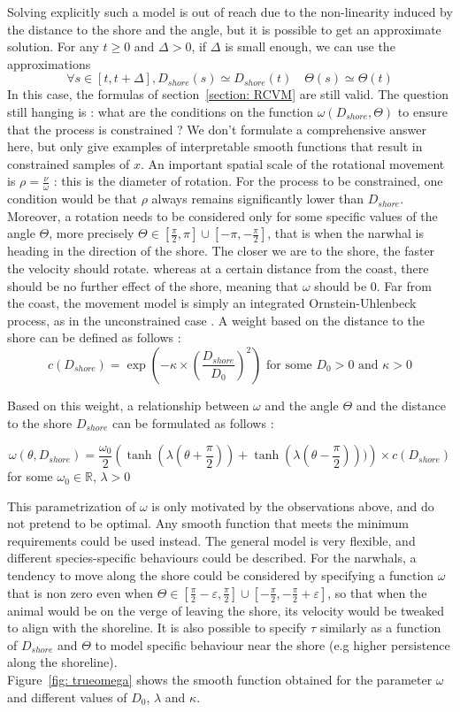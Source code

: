 \documentclass[11pt]{article}
\newcommand {\R}{\mathbb{R}}
\newcommand {\1}{\mathbb{1}}
\begin{document}
 Solving explicitly such a model is out of reach due to the non-linearity induced by the distance to the shore and the angle, but it is possible to get an approximate solution.
 For any $t \geq 0$ and $\Delta>0$, if $\Delta$ is small enough, we can use the approximations
 \[\forall s \in [t,t+\Delta], D_{shore}(s) \simeq D_{shore}(t) \quad \Theta(s)\simeq \Theta(t)\]
 In this case, the formulas of section~\ref{section: RCVM} are still valid.
 The question still hanging is : what are the conditions on the function $\omega(D_{shore},\Theta)$ to ensure that the process is constrained ?
 We don't formulate a comprehensive answer here, but only give examples of interpretable smooth functions that result in constrained samples of $x$.
 An important spatial scale of the rotational movement is $\rho=\frac{\nu}{\omega}$ : this is the diameter of rotation. For the process to be constrained, one condition would be that $\rho$ always remains significantly lower than $D_{shore}$. Moreover, a rotation needs to be considered only for some specific values of the angle $\Theta$, more precisely $\Theta \in \left[\frac{\pi}{2},\pi\right] \cup \left[-\pi,-\frac{\pi}{2}\right]$, that is when the narwhal is heading in the direction of the shore.
 The closer we are to the shore, the faster the velocity should rotate. 
 whereas at a certain distance from the coast, there should be no further effect of the shore, meaning that $\omega$ should be $0$. Far from the coast, the movement model is simply an integrated Ornstein-Uhlenbeck process, as in the unconstrained case \cite{johnson_continuoustime_2008}.
 A weight based on the distance to the shore can be defined as follows :
 \[c(D_{shore})=\exp\left(-\kappa \times \left(\frac{D_{shore}}{D_0}\right)^2\right)\mbox{ for some } D_0>0 \mbox{ and } \kappa>0\]
 
 Based on this weight, a relationship between $\omega$ and the angle $\Theta$ and the distance to the shore $D_{shore}$ can be formulated as follows :
 
 \[
 \omega(\theta,D_{shore})=\frac{\omega_0}{2}\left(\tanh(\lambda(\theta+\frac{\pi}{2}))+\tanh(\lambda(\theta-\frac{\pi}{2})))\right)\times c(D_{shore})
 \]
 for some $\omega_0 \in \R$, $\lambda>0$
 
 This parametrization of $\omega$ is only motivated by the observations above, and do not pretend to be optimal. Any smooth function that meets the minimum requirements could be used instead. The general model is very flexible, and different species-specific behaviours could be described. For the narwhals, a tendency to move along the shore could be considered by specifying a function $\omega$ that is non zero even when $\Theta \in \left[\frac{\pi}{2}-\varepsilon,\frac{\pi}{2}\right] \cup \left[-\frac{\pi}{2},-\frac{\pi}{2}+\varepsilon\right]$, so that when the animal would be on the verge of leaving the shore, its velocity would be tweaked to align with the shoreline. It is also possible  to specify $\tau$ similarly as a function of $D_{shore}$ and $\Theta$ to model specific behaviour near the shore (e.g higher persistence along the shoreline).\\
 Figure~\ref{fig: trueomega} shows the smooth function obtained for the parameter $\omega$ and different values of $D_0$, $\lambda$ and $\kappa$.
 
\end{document}
